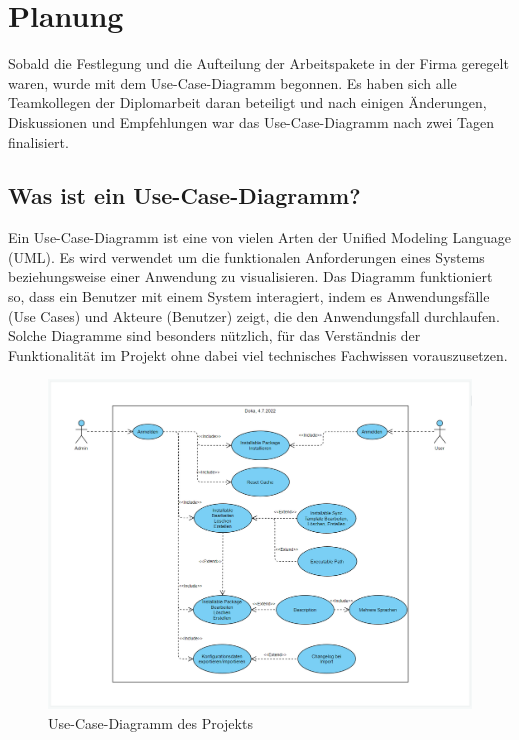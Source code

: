 \section{Planung}
Sobald die Festlegung und die Aufteilung der Arbeitspakete in der Firma geregelt waren, wurde mit dem Use-Case-Diagramm begonnen.
Es haben sich alle Teamkollegen der Diplomarbeit daran beteiligt und nach einigen Änderungen, Diskussionen und Empfehlungen 
war das Use-Case-Diagramm nach zwei Tagen finalisiert.
\\
\subsection*{Was ist ein Use-Case-Diagramm?}
Ein Use-Case-Diagramm ist eine von vielen Arten der Unified Modeling
Language (UML). Es wird verwendet um die funktionalen Anforderungen eines 
Systems beziehungsweise einer Anwendung zu visualisieren. Das Diagramm funktioniert 
so, dass ein Benutzer mit einem System interagiert, indem es Anwendungsfälle 
(Use Cases) und Akteure (Benutzer) zeigt, die den Anwendungsfall durchlaufen.
Solche Diagramme sind besonders nützlich, für das Verständnis der Funktionalität im 
Projekt ohne dabei viel technisches Fachwissen vorauszusetzen.\cite{APCW20018}

\begin{figure}[ht!]
    \centering
    \includegraphics[scale=0.3]{pics/UCD.png}
    \caption{\label{fig:The-caption}Use-Case-Diagramm des Projekts}
    \label{fig:impl:use-case-diagramm}
  \end{figure}
\newpage

